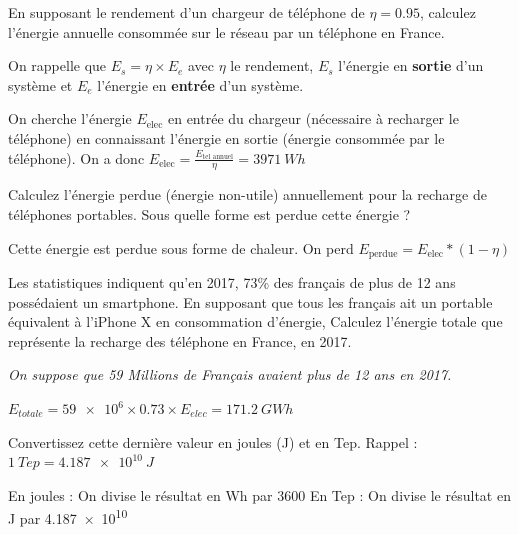 \documentclass[10pt,fleqn]{article} %
\begin{document}
\begin{exercise}
\begin{question}
  En supposant le rendement d'un chargeur de téléphone de $\eta = 0.95$, calculez l'énergie annuelle consommée sur le réseau par un téléphone en France.
  
  On rappelle que $E_s = \eta \times E_e$ avec $\eta$ le rendement, $E_s$ l'énergie en \textbf{sortie} d'un système et $E_e$ l'énergie en \textbf{entrée} d'un système. 
\end{question}
\begin{solution}
  On cherche l'énergie $E_{\text{elec}}$ en entrée du chargeur (nécessaire à recharger le téléphone) en connaissant l'énergie en sortie (énergie consommée par le téléphone). On a donc $ E_{\text{elec}} = \frac{E_{\text{tel annuel}}}{\eta} = \SI{3971}{Wh}$
\end{solution}

\begin{question}
Calculez l'énergie perdue (énergie non-utile) annuellement pour la recharge de téléphones portables. Sous quelle forme est perdue cette énergie ? 
\end{question}
\begin{solution}
  Cette énergie est perdue sous forme de chaleur. On perd $E_{\text{perdue}} = E_{\text{elec}} * (1-\eta) $
\end{solution}

\begin{question}
  Les statistiques indiquent qu'en 2017, 73\% des français de plus de 12 ans possédaient un smartphone. En supposant que tous les français ait un portable équivalent à l'iPhone X en consommation d'énergie, Calculez l'énergie totale que représente la recharge des téléphone en France, en 2017. 
  
  \textit{On suppose que 59 Millions de Français avaient plus de 12 ans en 2017. }
\end{question}
\begin{solution}
  $E_{totale} = \num{59e6}\times 0.73 \times E_{elec}  = \SI{171.2}{GWh}$
\end{solution}

\begin{question}
Convertissez cette dernière valeur en joules (J) et en Tep. Rappel : $\SI{1}{Tep} = \SI{4.187e10}{J}$
\end{question}

\begin{solution}
  En joules : On divise le résultat en Wh par 3600
  En Tep : On divise le résultat en J par \num{4.187e10}
\end{solution}
\end{exercise}
\end{document}
